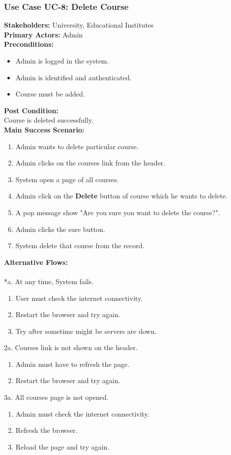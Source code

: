 \documentclass[12pt]{article}
\begin{document}
\subsubsection{Use Case UC-8: Delete Course}
\textbf{Stakeholders: } University, Educational Institutes \\
\textbf{Primary Actors: } Admin \\
\textbf{Preconditions:}
\begin{itemize}
\item Admin is logged in the system.
\item Admin is identified and authenticated.
\item Course must be added.
\end{itemize}
\textbf{Post Condition: }\\
Course is deleted successfully.\\
\textbf{Main Success Scenario:}
\begin{enumerate}
\item Admin wants to delete particular course.
\item Admin clicks on the courses link from the header.
\item System open a page of all courses.
\item Admin click on the \textbf{Delete} button of course which he wants to delete.
\item A pop message show "Are you sure you want to delete the course?".
\item Admin clicks the sure button.
\item System delete that course from the record.
\end{enumerate}
\textbf{Alternative Flows:}\\
\\
*a. At any time, System fails.
\begin{enumerate}
\item User must check the internet connectivity.
\item Restart the browser and try again.
\item Try after sometime might be servers are down.
\end{enumerate}
2a. Courses link is not shown on the header.
\begin{enumerate}
\item Admin must have to refresh the page.
\item Restart the browser and try again.
\end{enumerate} 
3a. All courses page is not opened.
\begin{enumerate}
\item Admin must check the internet connectivity.
\item Refresh the browser.
\item Reload the page and try again.
\end{enumerate}
\end{document}
